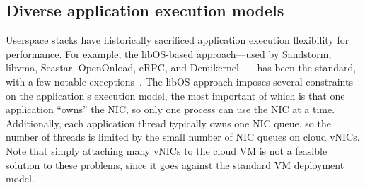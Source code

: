 


\subsection{Diverse application execution models}
\label{sec:execution-models}
Userspace stacks have historically sacrificed application execution flexibility for performance.
For example, the libOS-based approach---used by Sandstorm, libvma, Seastar, OpenOnload, eRPC, and Demikernel~\cite{Marinos:sigcomm14, libvma, seastar, openonload, erpc, demi-kernel} ---has been the standard, with a few notable exceptions~\cite{tas, snap}.
The libOS approach imposes several constraints on the application's execution model, the most important of which is that one application ``owns'' the NIC, so only one process can use the NIC at a time.
Additionally, each application thread typically owns one NIC queue, so the number of threads is limited by the small number of NIC queues on cloud vNICs.
Note that simply attaching many vNICs to the cloud VM is not a feasible solution to these problems, since it goes against the standard VM deployment model.

